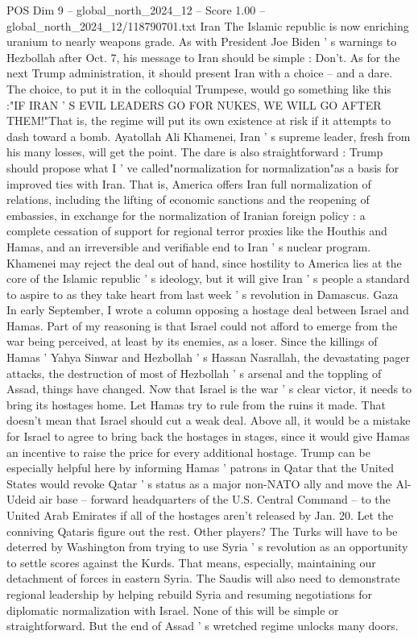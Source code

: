 \begin{textsample}{POS Dim 9 – global\_north\_2024\_12 – Score 1.00 – global\_north\_2024\_12/118790701.txt}
Iran The Islamic republic is now enriching uranium to nearly weapons grade.
As with President Joe Biden ' s warnings to Hezbollah after Oct. 7, his message to Iran should be simple : Don't.
As for the next Trump administration, it should present Iran with a choice -- and a dare.
The choice, to put it in the colloquial Trumpese, would go something like this :"IF IRAN ' S EVIL LEADERS GO FOR NUKES, WE WILL GO AFTER THEM!"That is, the regime will put its own existence at risk if it attempts to dash toward a bomb.
Ayatollah Ali Khamenei, Iran ' s supreme leader, fresh from his many losses, will get the point.
The dare is also straightforward : Trump should propose what I ' ve called"normalization for normalization"as a basis for improved ties with Iran.
That is, America offers Iran full normalization of relations, including the lifting of economic sanctions and the reopening of embassies, in exchange for the normalization of Iranian foreign policy : a complete cessation of support for regional terror proxies like the Houthis and Hamas, and an irreversible and verifiable end to Iran ' s nuclear program.
Khamenei may reject the deal out of hand, since hostility to America lies at the core of the Islamic republic ' s ideology, but it will give Iran ' s people a standard to aspire to as they take heart from last week ' s revolution in Damascus.
Gaza In early September, I wrote a column opposing a hostage deal between Israel and Hamas.
Part of my reasoning is that Israel could not afford to emerge from the war being perceived, at least by its enemies, as a loser.
Since the killings of Hamas ' Yahya Sinwar and Hezbollah ' s Hassan Nasrallah, the devastating pager attacks, the destruction of most of Hezbollah ' s arsenal and the toppling of Assad, things have changed.
Now that Israel is the war ' s clear victor, it needs to bring its hostages home.
Let Hamas try to rule from the ruins it made.
That doesn't mean that Israel should cut a weak deal.
Above all, it would be a mistake for Israel to agree to bring back the hostages in stages, since it would give Hamas an incentive to raise the price for every additional hostage.
Trump can be especially helpful here by informing Hamas ' patrons in Qatar that the United States would revoke Qatar ' s status as a major non-NATO ally and move the Al-Udeid air base -- forward headquarters of the U.S.
Central Command -- to the United Arab Emirates if all of the hostages aren't released by Jan. 20.
Let the conniving Qataris figure out the rest.
Other players?
The Turks will have to be deterred by Washington from trying to use Syria ' s revolution as an opportunity to settle scores against the Kurds.
That means, especially, maintaining our detachment of forces in eastern Syria.
The Saudis will also need to demonstrate regional leadership by helping rebuild Syria and resuming negotiations for diplomatic normalization with Israel.
None of this will be simple or straightforward.
But the end of Assad ' s wretched regime unlocks many doors.

\end{textsample}

